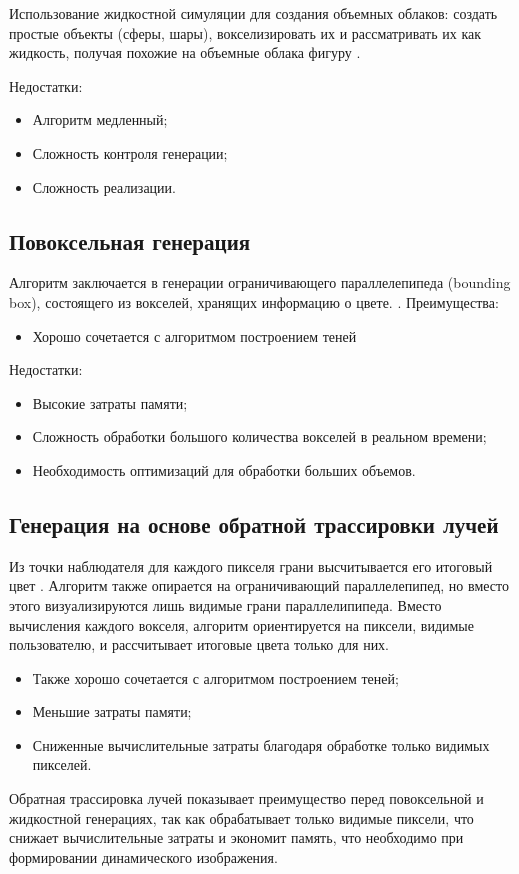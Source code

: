 Использование жидкостной симуляции для создания объемных облаков: создать простые объекты (сферы, шары), вокселизировать их и рассматривать их как жидкость, получая похожие на объемные облака фигуру \cite{guerrilla_volumetric_cloudscapes_2023}.

Недостатки: 
\begin{itemize}
	\item Алгоритм медленный;
	\item Сложность контроля генерации;
	\item Сложность реализации.
\end{itemize}
\subsection{Повоксельная генерация}
Алгоритм заключается в генерации ограничивающего параллелепипеда (bounding box), состоящего из вокселей, хранящих информацию о цвете. \cite{guerrilla_volumetric_cloudscapes_2023}.
Преимущества:
\begin{itemize} 
	\item Хорошо сочетается с алгоритмом построением теней
\end{itemize}
Недостатки: 
\begin{itemize} 
	\item Высокие затраты памяти; 
	\item Сложность обработки большого количества вокселей в реальном времени; 
	\item Необходимость оптимизаций для обработки больших объемов. 
\end{itemize}
\subsection{Генерация на основе обратной трассировки лучей}
Из точки наблюдателя для каждого пикселя грани высчитывается его итоговый цвет \cite{Patapom2013}.
Алгоритм также опирается на ограничивающий параллелепипед, но вместо этого визуализируются лишь видимые грани параллелипипеда. Вместо вычисления каждого вокселя, алгоритм ориентируется на пиксели, видимые пользователю, и рассчитывает итоговые цвета только для них. 
\begin{itemize} 
	\item Также хорошо сочетается с алгоритмом построением теней;
	\item Меньшие затраты памяти; 
	\item Сниженные вычислительные затраты благодаря обработке только видимых пикселей.
\end{itemize}
Обратная трассировка лучей показывает преимущество перед повоксельной и жидкостной генерациях, так как обрабатывает только видимые пиксели, что снижает вычислительные затраты и экономит память, что необходимо при формировании динамического изображения.


